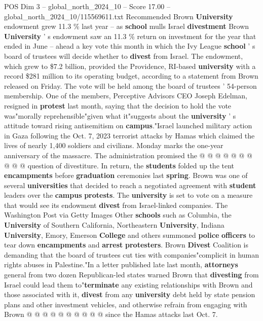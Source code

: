 \begin{textsample}{POS Dim 3 – global\_north\_2024\_10 – Score 17.00 – global\_north\_2024\_10/115569611.txt}  \label{ex:f3_pos_155}
Recommended Brown \textbf{University} endowment grew 11.3 \% last year -- as \textbf{school} mulls Israel \textbf{divestment} Brown \textbf{University} ' s endowment saw an 11.3 \% return on investment for the year that ended in June -- ahead a key vote this month in which the Ivy League \textbf{school} ' s board of trustees will decide whether to \textbf{divest} from Israel.
The endowment, which grew to \$7.2 billion, provided the Providence, RI-based \textbf{university} with a record \$281 million to its operating budget, according to a statement from Brown released on Friday.
The vote will be held among the board of trustees ' 54-person membership.
One of the members, Perceptive Advisors CEO Joseph Edelman, resigned in \textbf{protest} last month, saying that the decision to hold the vote was"morally reprehensible"given what it"suggests about the \textbf{university} ' s attitude toward rising antisemitism on \textbf{campus}."Israel launched military action in Gaza following the Oct. 7, 2023 terrorist attacks by Hamas which claimed the lives of nearly 1,400 soldiers and civilians.
Monday marks the one-year anniversary of the massacre.
The administration promised the @ @ @ @ @ @ @ @ @ @ question of divestiture.
In return, the \textbf{students} folded up the tent \textbf{encampments} before \textbf{graduation} ceremonies last \textbf{spring}.
Brown was one of several \textbf{universities} that decided to reach a negotiated agreement with \textbf{student} leaders over the \textbf{campus} \textbf{protests}.
The \textbf{university} is set to vote on a measure that would see its endowment \textbf{divest} from Israel-linked companies.
The Washington Post via Getty Images Other \textbf{schools} such as Columbia, the \textbf{University} of Southern California, Northeastern \textbf{University}, Indiana \textbf{University}, Emory, Emerson \textbf{College} and others summoned \textbf{police} \textbf{officers} to tear down \textbf{encampments} and \textbf{arrest} \textbf{protesters}.
Brown \textbf{Divest} Coalition is demanding that the board of trustees cut ties with companies"complicit in human rights abuses in Palestine."In a letter published late last month, \textbf{attorneys} general from two dozen Republican-led states warned Brown that \textbf{divesting} from Israel could lead them to"\textbf{terminate} any existing relationships with Brown and those associated with it, \textbf{divest} from any \textbf{university} debt held by state pension plans and other investment vehicles, and otherwise refrain from engaging with Brown @ @ @ @ @ @ @ @ @ @ since the Hamas attacks last Oct. 7.

\end{textsample}
